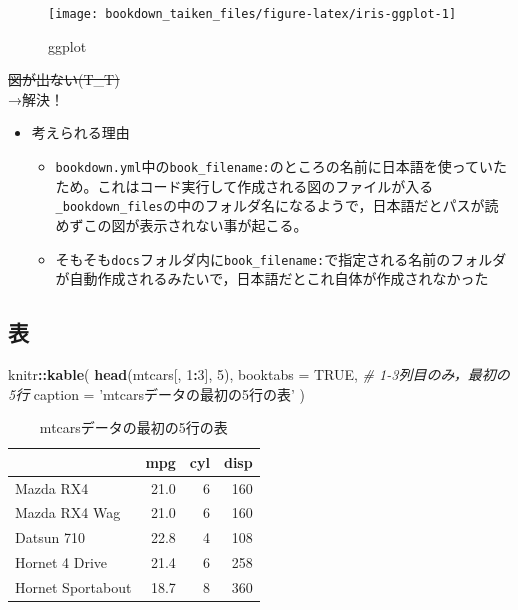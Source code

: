 \documentclass[xelatex,ja=standard]{bxjsbook}
\newenvironment{Shaded}{\begin{snugshade}}{\end{snugshade}}
\newcommand{\CommentTok}[1]{\textcolor[rgb]{0.56,0.35,0.01}{\textit{#1}}}
\newcommand{\DataTypeTok}[1]{\textcolor[rgb]{0.13,0.29,0.53}{#1}}
\newcommand{\DecValTok}[1]{\textcolor[rgb]{0.00,0.00,0.81}{#1}}
\newcommand{\KeywordTok}[1]{\textcolor[rgb]{0.13,0.29,0.53}{\textbf{#1}}}
\newcommand{\NormalTok}[1]{#1}
\newcommand{\OperatorTok}[1]{\textcolor[rgb]{0.81,0.36,0.00}{\textbf{#1}}}
\newcommand{\OtherTok}[1]{\textcolor[rgb]{0.56,0.35,0.01}{#1}}
\newcommand{\StringTok}[1]{\textcolor[rgb]{0.31,0.60,0.02}{#1}}
\providecommand{\tightlist}{%
  \setlength{\itemsep}{0pt}\setlength{\parskip}{0pt}}
\begin{document}
\begin{figure}

{\centering \texttt{[image: bookdown\_taiken\_files/figure-latex/iris-ggplot-1]} 

}

\caption{ggplot}\label{fig:iris-ggplot}
\end{figure}

\sout{図が出ない(T\_T)}\\
→解決！

\begin{itemize}
\tightlist
\item
  考えられる理由

  \begin{itemize}
  \tightlist
  \item
    \texttt{bookdown.yml}中の\texttt{book\_filename:}のところの名前に日本語を使っていたため。これはコード実行して作成される図のファイルが入る\texttt{\_bookdown\_files}の中のフォルダ名になるようで，日本語だとパスが読めずこの図が表示されない事が起こる。
  \item
    そもそも\texttt{docs}フォルダ内に\texttt{book\_filename:}で指定される名前のフォルダが自動作成されるみたいで，日本語だとこれ自体が作成されなかった
  \end{itemize}
\end{itemize}

\hypertarget{figure_table}{%
\subsection{表}\label{figure_table}}

\begin{Shaded}
\begin{Highlighting}[]
\NormalTok{knitr}\OperatorTok{::}\KeywordTok{kable}\NormalTok{(}
  \KeywordTok{head}\NormalTok{(mtcars[, }\DecValTok{1}\OperatorTok{:}\DecValTok{3}\NormalTok{], }\DecValTok{5}\NormalTok{), }\DataTypeTok{booktabs =} \OtherTok{TRUE}\NormalTok{, }\CommentTok{# 1-3列目のみ，最初の5行}
  \DataTypeTok{caption =} \StringTok{'mtcarsデータの最初の5行の表'}
\NormalTok{)}
\end{Highlighting}
\end{Shaded}

\begin{table}

\caption{\label{tab:table-mtcar}mtcarsデータの最初の5行の表}
\centering
\begin{tabular}[t]{lrrr}
\toprule
  & mpg & cyl & disp\\
\midrule
Mazda RX4 & 21.0 & 6 & 160\\
Mazda RX4 Wag & 21.0 & 6 & 160\\
Datsun 710 & 22.8 & 4 & 108\\
Hornet 4 Drive & 21.4 & 6 & 258\\
Hornet Sportabout & 18.7 & 8 & 360\\
\bottomrule
\end{tabular}
\end{table}
\end{document}

